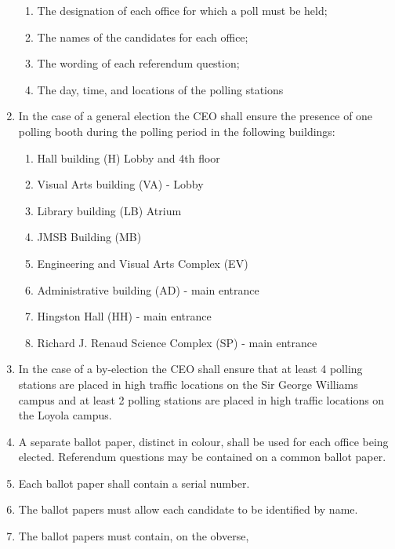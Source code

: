 \documentclass[oneside]{book}
\begin{document}
\begin{enumerate}
\begin{enumerate}
\item The designation of each office for which a poll must be held; 
\item The names of the candidates for each office; 
\item The wording of each referendum question; 
\item The day, time, and locations of the polling stations 
\end{enumerate}
\item In the case of a general election the CEO shall ensure the presence
of one polling booth during the polling period in the following buildings: 

\begin{enumerate}
\item Hall building (H) Lobby and 4th floor 
\item Visual Arts building (VA) - Lobby 
\item Library building (LB) Atrium 
\item JMSB Building (MB) 
\item Engineering and Visual Arts Complex (EV) 
\item Administrative building (AD) - main entrance 
\item Hingston Hall (HH) - main entrance 
\item Richard J. Renaud Science Complex (SP) - main entrance 
\end{enumerate}
\item In the case of a by-election the CEO shall ensure that at least 4
polling stations are placed in high traffic locations on the Sir George
Williams campus and at least 2 polling stations are placed in high
traffic locations on the Loyola campus. 
\item A separate ballot paper, distinct in colour, shall be used for each
office being elected. Referendum questions may be contained on a common
ballot paper. 
\item Each ballot paper shall contain a serial number. 
\item The ballot papers must allow each candidate to be identified by name. 
\item The ballot papers must contain, on the obverse, 


\end{enumerate}
\end{document}
